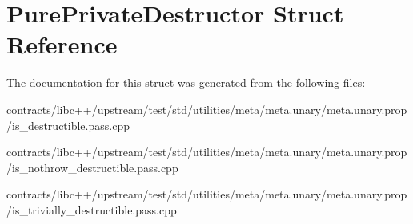 \hypertarget{struct_pure_private_destructor}{}\section{Pure\+Private\+Destructor Struct Reference}
\label{struct_pure_private_destructor}


The documentation for this struct was generated from the following files\+:\begin{DoxyCompactItemize}
\item 
contracts/libc++/upstream/test/std/utilities/meta/meta.\+unary/meta.\+unary.\+prop/is\+\_\+destructible.\+pass.\+cpp\item 
contracts/libc++/upstream/test/std/utilities/meta/meta.\+unary/meta.\+unary.\+prop/is\+\_\+nothrow\+\_\+destructible.\+pass.\+cpp\item 
contracts/libc++/upstream/test/std/utilities/meta/meta.\+unary/meta.\+unary.\+prop/is\+\_\+trivially\+\_\+destructible.\+pass.\+cpp\end{DoxyCompactItemize}
